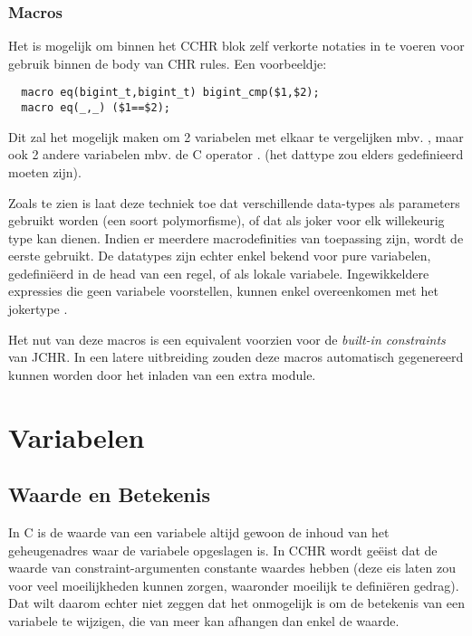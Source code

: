 \subsubsection{Macros}

Het is mogelijk om binnen het CCHR blok zelf verkorte notaties in te voeren voor gebruik binnen de body van CHR rules. Een voorbeeldje: \begin{Verbatim}
  macro eq(bigint_t,bigint_t) bigint_cmp($1,$2);
  macro eq(_,_) ($1==$2);
\end{Verbatim}

Dit zal het mogelijk maken om 2  variabelen met elkaar te vergelijken mbv. , maar ook 2 andere variabelen mbv. de C operator \code{==}. (het dattype  zou elders gedefinieerd moeten zijn).

Zoals te zien is laat deze techniek toe dat verschillende data-types als parameters gebruikt worden (een soort polymorfisme), of dat \code{\_} als joker voor elk willekeurig type kan dienen. Indien er meerdere macrodefinities van toepassing zijn, wordt de eerste gebruikt. De datatypes zijn echter enkel bekend voor pure variabelen, gedefini\"eerd in de head van een regel, of als lokale variabele. Ingewikkeldere expressies die geen variabele voorstellen, kunnen enkel overeenkomen met het jokertype \code{\_}.

Het nut van deze macros is een equivalent voorzien voor de {\em built-in constraints} van JCHR. In een latere uitbreiding zouden deze macros automatisch gegenereerd kunnen worden door het inladen van een extra module.

\section{Variabelen}

\subsection{Waarde en Betekenis}

In C is de waarde van een variabele altijd gewoon de inhoud van het geheugenadres waar de variabele opgeslagen is. In CCHR wordt ge\"eist dat de waarde van constraint-argumenten constante waardes hebben (deze eis laten zou voor veel moeilijkheden kunnen zorgen, waaronder moeilijk te defini\"eren gedrag). Dat wilt daarom echter niet zeggen dat het onmogelijk is om de betekenis van een variabele te wijzigen, die van meer kan afhangen dan enkel de waarde. 


